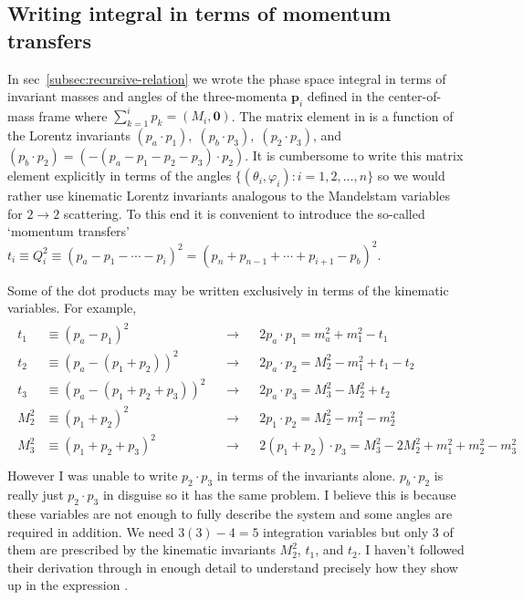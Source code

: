\vspace{7px}
\subsection{Writing integral in terms of momentum transfers}\label{subsec:momentum-transfers}

In sec~\ref{subsec:recursive-relation} we wrote the phase space integral in terms of invariant masses and angles of the three-momenta $\bm{p}_i$ defined in the center-of-mass frame where $\sum_{k=1}^{i} p_k = (M_{i}, \bm{0})$. 
The matrix element in  is a function of the Lorentz invariants $(p_a \cdot p_1), \; (p_b \cdot p_3), \; (p_2 \cdot p_3)$, and $(p_b \cdot p_2) = (- (p_a - p_1 - p_2 - p_3) \cdot p_2)$. 
It is cumbersome to write this matrix element explicitly in terms of the angles $\{ (\theta_i, \varphi_i) : i = 1, 2, \ldots, n\}$ so we would rather use kinematic Lorentz invariants analogous to the Mandelstam variables for $2 \rightarrow 2$ scattering.
To this end it is convenient to introduce the so-called `momentum transfers' $t_i \equiv Q_i^2 \equiv (p_a - p_1 - \cdots - p_i)^2 = (p_n + p_{n-1} + \cdots + p_{i + 1} - p_b)^2$.

Some of the dot products may be written exclusively in terms of the kinematic variables. For example,
\begin{gather*}
    \begin{align*}
        t_1 &\equiv (p_a - p_1)^2 &&\rightarrow &&2 p_a \cdot p_1 = m_a^2 +  m_1^2 - t_1 \\
        t_2 &\equiv (p_a - (p_1 + p_2))^2 &&\rightarrow &&2 p_a \cdot p_2 = M_2^2 - m_1^2 + t_1 - t_2 \\
        t_3 &\equiv (p_a - (p_1 + p_2 + p_3))^2 &&\rightarrow &&2 p_a \cdot p_3 = M_3^2 - M_2^2 + t_2 \\
        M_2^2 &\equiv (p_1 + p_2)^2 &&\rightarrow &&2 p_1 \cdot p_2 = M_2^2 - m_1^2 - m_2^2 \\
        M_3^2 &\equiv (p_1 + p_2 + p_3)^2 &&\rightarrow &&2 (p_1 + p_2) \cdot p_3 = M_3^2 - 2 M_2^2 + m_1^2 + m_2^2 - m_3^2 \\
    \end{align*}
\end{gather*}
However I was unable to write $p_2 \cdot p_3$ in terms of the invariants alone. 
$p_b \cdot p_2$ is really just $p_2 \cdot p_3$ in disguise so it has the same problem.
I believe this is because these variables are not enough to fully describe the system and some angles are required in addition. 
We need $3(3) - 4 = 5$ integration variables but only $3$ of them are prescribed by the kinematic invariants $M_2^2$, $t_1$, and $t_2$\footnotemark.
I haven't followed their derivation through in enough detail to understand precisely how they show up in the expression 
.

